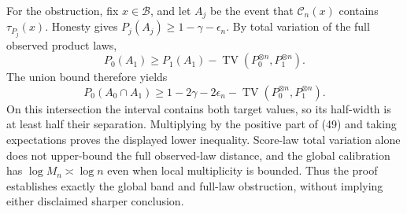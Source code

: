 For the obstruction, fix \(x\in\mathcal B\), and let \(A_j\) be the event that \(\mathcal C_n(x)\) contains \(\tau_{P_j}(x)\).  Honesty gives \(P_j(A_j)\ge1-\gamma-\epsilon_n\).  By total variation of the full observed product laws,
\[
 P_0(A_1)\ge P_1(A_1)-\operatorname{TV}(P_0^{\otimes n},P_1^{\otimes n}).
\]
The union bound therefore yields
\[
 P_0(A_0\cap A_1)\ge1-2\gamma-2\epsilon_n-
 \operatorname{TV}(P_0^{\otimes n},P_1^{\otimes n}). \tag{49}
\]
On this intersection the interval contains both target values, so its half-width is at least half their separation.  Multiplying by the positive part of (49) and taking expectations proves the displayed lower inequality.  Score-law total variation alone does not upper-bound the full observed-law distance, and the global calibration has \(\log M_n\asymp\log n\) even when local multiplicity is bounded.  Thus the proof establishes exactly the global band and full-law obstruction, without implying either disclaimed sharper conclusion.